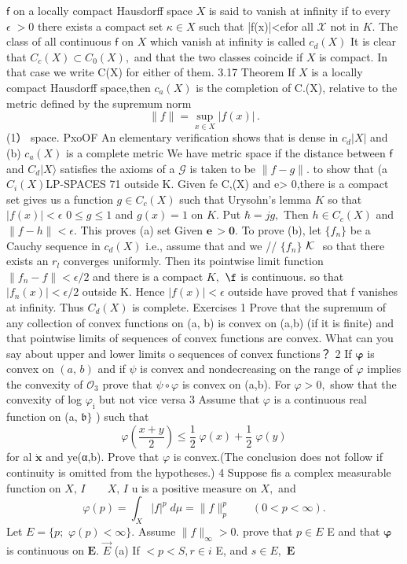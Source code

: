 $\boldsymbol{\mathsf{f}}$ on a locally compact Hausdorff space $X$ is said to vanish at infinity if to every $\scriptstyle\epsilon\;>0$ there exists a compact set $\kappa\in X$ such that |f(x)|<efor all $\scriptstyle{\mathcal{X}}$ not in $K.$ The class of all continuous $\boldsymbol{\mathsf{f}}$ on $X$ which vanish at infinity is called $c_{d}(X)$ It is clear that $C_{c}(X)\subset C_{0}(X),$ and that the two classes coincide if $X$ is compact. In that case we write C(X) for either of them. 3.17 Theorem If $X$ is a locally compact Hausdorff space,then $\scriptstyle c_{a}(X)$ is the completion of C.(X), relative to the metric defined by the supremum norm $$ \|f\|=\operatorname*{sup}_{x\in X}|f(x)|\,. $$ (1） space. PxoOF An elementary verification shows that is dense in $\scriptstyle c_{d}|X|$ and (b) $c_{a}(X)$ is a complete metric We have metric space if the distance between $\boldsymbol{\mathsf{f}}$ and $\scriptstyle C_{d}|X\rangle$ satisfies the axioms of a $\scriptstyle{\mathcal{G}}$ is taken to be $\|f-g\|.$ to show that (a $\scriptstyle C_{i}(X)$LP-SPACES 71 outside K. Given fe C,(X) and e> 0,there is a compact set gives us a function $g\in C_{c}(X)$ such that Urysohn's lemma $\textstyle K$ so that $|f(x)|<\epsilon$ $0\leq g\leq1$ and $g(x)=1$ on $K.$ Put $\hbar=j g,$ Then $h\in C_{c}(X)$ and $\|f-h\|<\epsilon.$ This proves (a) set Given $\mathbf{e\!\,\!>\!0}.$ To prove (b), let $\{f_{n}\}$ be a Cauchy sequence in $c_{d}(X)$ i.e., assume that and we // $\{f_{n}\}$ ${\cal K}\,\,$ so that there exists an $r_{\mathit{l}}$ converges uniformly. Then its pointwise limit function $\|f_{n}-f\|<\epsilon/2$ and there is a compact $K,$ $\boldsymbol{\f}$ is continuous. so that $|f_{n}(x)|<\epsilon/2$ outside K. Hence $|f(x)|<\epsilon$ outside have proved that f vanishes at infinity. Thus $\scriptstyle C_{d}(X)$ is complete. Exercises 1 Prove that the supremum of any collection of convex functions on (a, b) is convex on (a,b) (if it is finite) and that pointwise limits of sequences of convex functions are convex. What can you say about upper and lower limits o sequences of convex functions？ 2 If $\textstyle\mathcal{\boldsymbol{\varphi}}$ is convex on $(a,\,b)$ and if $\psi$ is convex and nondecreasing on the range of $\mathcal{\varphi}$ implies the convexity of ${\mathcal{O}}_{3}$ prove that $\psi\circ\varphi$ is convex on (a,b). For $\varphi>0,$ show that the convexity of log $\varphi_{\mathrm{i}}$ but not vice versa 3 Assume that $\mathcal{\varphi}$ is a continuous real function on (a, ${\mathfrak{b}}\}$ ) such that $$ \varphi\!\left({\frac{x+y}{2}}\right)\leq{\frac{1}{2}}\;\varphi(x)+{\frac{1}{2}}\;\varphi(y) $$ for al $\scriptstyle{\dot{\boldsymbol{x}}}$ and ye(α,b). Prove that $\textstyle{\varphi}$ is convex.(The conclusion does not follow if continuity is omitted from the hypotheses.) 4 Suppose fis a complex measurable function on $X,\,I\qquad X,\,I$ u is a positive measure on $X,$ and $$ \varphi(p)=\int_{X}|f|^{p}\;d\mu=\|f\|_{p}^{p}\qquad(0<p<\infty). $$ Let $E=\{p;$ $\varphi(p)<\infty\}.$ Assume $\|f\|_{\infty}>0.$ prove that $p\in E$ E and that $\textstyle\mathcal{\boldsymbol{\varphi}}$ is continuous on ${\boldsymbol{E}}.$ $\scriptstyle{\vec{E}}$ (a) If $\textstyle<p<S,r\in i$ E, and $s\in E,$ $\boldsymbol{E}$ 